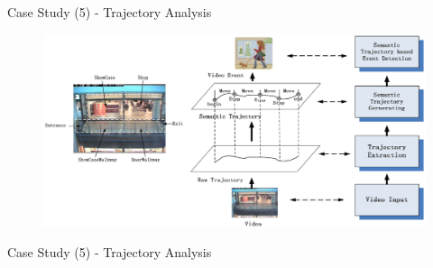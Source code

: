 \documentclass[
 size=14pt,
 paper=smartboard,  %
 mode=present, 		%
 display=slides, 	%
 style=tuliplab,  	%
 pauseslide,
 fleqn,leqno]{powerdot}{}
\begin{document}
\begin{slide}[toc=,bm=]{Case Study (5) - Trajectory Analysis}
\begin{figure}[htbp]
  \includegraphics[width=1.0\textwidth]{figures//theme1//dsa_3.eps}
\end{figure}


\end{slide}



\begin{slide}[toc=,bm=]{Case Study (5) - Trajectory Analysis}
\begin{figure}[ht]
\end{figure}
\end{slide}
\end{document}
